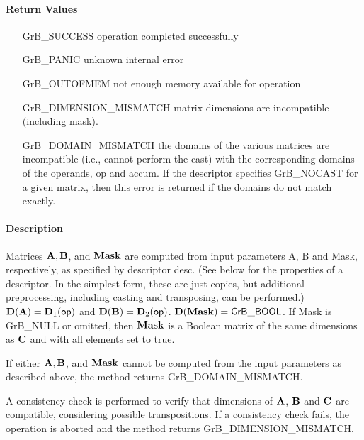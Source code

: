 \paragraph{Return Values}

\begin{itemize}[leftmargin=2.1in]
\item[{\sf GrB\_SUCCESS}]             operation completed successfully
\item[{\sf GrB\_PANIC}]               unknown internal error
\item[{\sf GrB\_OUTOFMEM}]            not enough memory available for operation
\item[{\sf GrB\_DIMENSION\_MISMATCH}] matrix dimensions are incompatible (including mask).
\item[{\sf GrB\_DOMAIN\_MISMATCH}]    the domains of the various matrices are incompatible (i.e., cannot 
perform the cast) with the corresponding domains of the operands, {\sf op} and {\sf accum}.  
If the descriptor specifies {\sf GrB\_NOCAST} for a given matrix, then this error is returned if 
the domains do not match exactly.
\end{itemize}


\paragraph{Description}

Matrices ${\bf A}, {\bf B}$, and ${\bf Mask}$ are computed from
input parameters {\sf A}, {\sf B} and {\sf Mask}, respectively, as specified
by descriptor {\sf desc}. (See below for the properties of a descriptor. In
the simplest form, these are just copies, but additional preprocessing,
including casting and transposing, can be performed.)  $\bold{D}({\bf A}) =
\bold{D}_1({\sf op})$ and $\bold{D}({\bf B}) = \bold{D}_2({\sf op})$.
$\bold{D}({\bf Mask}) = {\sf GrB\_BOOL}$.  If {\sf Mask} is {\sf GrB\_NULL} or omitted,
then ${\bf Mask}$ is a Boolean matrix of the same dimensions as ${\bf C}$
and with all elements set to {\sf true}.

If either ${\bf A}, {\bf B}$, and ${\bf Mask}$  cannot be computed
from the input parameters as described above, the method returns {\sf
GrB\_DOMAIN\_MISMATCH}.

A consistency check is performed to verify that dimensions of ${\bf A}$, ${\bf B}$
and ${\bf C}$ are compatible, considering possible transpositions.  If a consistency check fails, the operation is
aborted and the method returns {\sf GrB\_DIMENSION\_MISMATCH}.

